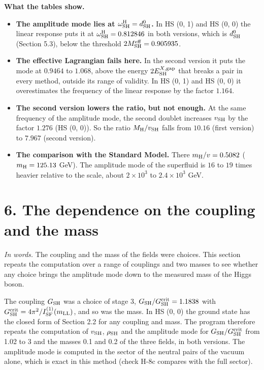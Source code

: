 \documentclass[
  10pt,
]{article}
\providecommand{\tightlist}{%
  \setlength{\itemsep}{0pt}\setlength{\parskip}{0pt}}
\begin{document}
\textbf{What the tables show.}

\begin{itemize}
\tightlist
\item
  \textbf{The amplitude mode lies at
  \(\omega^{\rm H}_{\rm SH}=d^0_{\rm SH}\).} In HS (0, 1) and HS (0, 0)
  the linear response puts it at \(\omega^{\rm H}_{\rm SH}=0.812846\) in
  both versions, which is \(d^0_{\rm SH}\) (Section 5.3), below the
  threshold \(2M^{\rm eff}_{\rm SH}=0.905935\).
\item
  \textbf{The effective Lagrangian fails here.} In the second version it
  puts the mode at \(0.9464\) to \(1.068\), above the energy
  \(2E^{X,{\rm gap}}_{\rm SH}\) that breaks a pair in every method,
  outside its range of validity. In HS (0, 1) and HS (0, 0) it
  overestimates the frequency of the linear response by the factor
  \(1.164\).
\item
  \textbf{The second version lowers the ratio, but not enough.} At the
  same frequency of the amplitude mode, the second doublet increases
  \(v_{\rm SH}\) by the factor \(1.276\) (HS (0, 0)). So the ratio
  \(M_{\rm H}/v_{\rm SH}\) falls from \(10.16\) (first version) to
  \(7.967\) (second version).
\item
  \textbf{The comparison with the Standard Model.} There
  \(m_{\rm H}/v=0.5082\) (\(m_{\rm H}=125.13\) GeV). The amplitude mode
  of the superfluid is \(16\) to \(19\) times heavier relative to the
  scale, about \(2\times10^{3}\) to \(2.4\times10^{3}\) GeV.
\end{itemize}

\hypertarget{the-dependence-on-the-coupling-and-the-mass}{%
\section{6. The dependence on the coupling and the
mass}\label{the-dependence-on-the-coupling-and-the-mass}}

\emph{In words.} The coupling and the mass of the fields were choices.
This section repeats the computation over a range of couplings and two
masses to see whether any choice brings the amplitude mode down to the
measured mass of the Higgs boson.

The coupling \(G_{\rm SH}\) was a choice of stage 3,
\(G_{\rm SH}/G^{\rm crit}_{\rm SH}=1.1838\) with
\(G^{\rm crit}_{\rm SH}=4\pi^2/I^{(1)}_{\rm SF}(m_{\rm LL})\), and so
was the mass. In HS (0, 0) the ground state has the closed form of
Section 2.2 for any coupling and mass. The program therefore repeats the
computation of \(v_{\rm SH}\), \(\rho_{\rm SH}\) and the amplitude mode
for \(G_{\rm SH}/G^{\rm crit}_{\rm SH}\) from 1.02 to 3 and the masses
0.1 and 0.2 of the three fields, in both versions. The amplitude mode is
computed in the sector of the neutral pairs of the vacuum alone, which
is exact in this method (check H-8c compares with the full sector).
\end{document}
